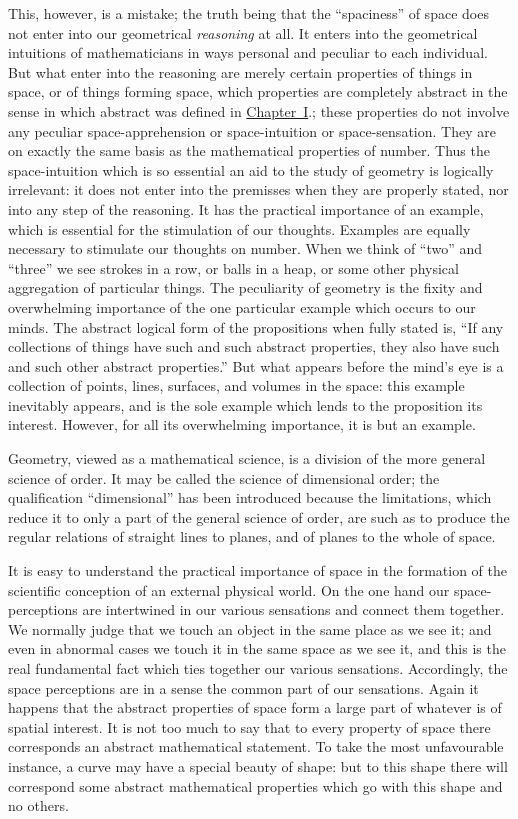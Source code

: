 \documentclass[12pt,leqno]{book}[2005/09/16]
\newcommand{\Chg}[2]{#2}
\newcommand{\ChapRef}[2][Chapter]{\hyperref[chapter:#2]{\Chg{#1}{Chapter}~#2}}
\newcommand{\PageSep}[1]{\ignorespaces}
\begin{document}
This, however, is a mistake; the truth being
%
that the ``spaciness'' of space does not enter
into our geometrical \emph{reasoning} at all. It
enters into the geometrical intuitions of
mathematicians in ways personal and peculiar
to each individual. But what enter into the
reasoning are merely certain properties of
things in space, or of things forming space,
which properties are completely abstract in
the sense in which abstract was defined in
\ChapRef{I}.; these properties do not involve
any peculiar space-apprehension or space-intuition
or space-sensation. They are on
exactly the same basis as the mathematical
properties of number. Thus the space-intuition
which is so essential an aid to the study
of geometry is logically irrelevant: it does
not enter into the premisses when they are
properly stated, nor into any step of the reasoning.
It has the practical importance of an
example, which is essential for the stimulation
of our thoughts. Examples are equally necessary
to stimulate our thoughts on number.
When we think of ``two'' and ``three'' we
see strokes in a row, or balls in a heap, or
some other physical aggregation of particular
things. The peculiarity of geometry is the
fixity and overwhelming importance of the
one particular example which occurs to our
\PageSep{243}
minds. The abstract logical form of the
propositions when fully stated is, ``If any
collections of things have such and such
abstract properties, they also have such and
such other abstract properties.'' But what
appears before the mind's eye is a collection
of points, lines, surfaces, and volumes in the
space: this example inevitably appears, and
is the sole example which lends to the proposition
its interest. However, for all its overwhelming
importance, it is but an example.

Geometry, viewed as a mathematical science,
is a division of the more general science of
order. It may be called the science of dimensional
order; the qualification ``dimensional''
has been introduced because the limitations,
which reduce it to only a part of the general
science of order, are such as to produce the
regular relations of straight lines to planes,
and of planes to the whole of space.

It is easy to understand the practical importance
of space in the formation of the
scientific conception of an external physical
world. On the one hand our space-perceptions
are intertwined in our various sensations
and connect them together. We normally
judge that we touch an object in the same
place as we see it; and even in abnormal
cases we touch it in the same space as we see
it, and this is the real fundamental fact which
ties together our various sensations. Accordingly,
\PageSep{244}
the space perceptions are in a sense the
common part of our sensations. Again it
happens that the abstract properties of space
form a large part of whatever is of spatial
interest. It is not too much to say that to
every property of space there corresponds an
abstract mathematical statement. To take
the most unfavourable instance, a curve may
have a special beauty of shape: but to this
shape there will correspond some abstract
mathematical properties which go with this
shape and no others.
\end{document}
